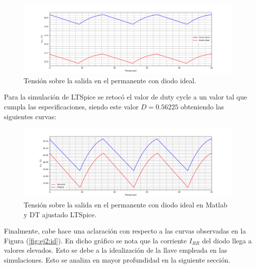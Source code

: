 \begin{figure}[H]
	\centering
	\includegraphics[width=0.9\linewidth]{ImagenesEjercicio-2/vo_diodo_ideal.png}
	\caption{Tensión sobre la salida en el permanente con diodo ideal.}
	\label{fig:ej2:vo_diodo_ideal}
\end{figure}
Para la simulación de LTSpice se retocó el valor de duty cycle a un valor tal que cumpla las especificaciones, siendo este valor $D=0.56225$ obteniendo las siguientes curvas:
\begin{figure}[H]
	\centering
	\includegraphics[width=0.9\linewidth]{ImagenesEjercicio-2/vo_duty_ideal.png}
	\caption{Tensión sobre la salida en el permanente con diodo ideal en Matlab y DT ajustado LTSpice.}
	\label{fig:ej2:vo_diodo_ideal_ltspice}
\end{figure}

Finalmente, cabe hace una aclaración con respecto a las curvas observadas en la Figura (\ref{fig:ej2:id}). En dicho gráfico se nota que la corriente $I_{RR}$ del diodo llega a valores elevados. Esto se debe a la idealización de la llave empleada en las simulaciones. Esto se analiza en mayor profundidad en la siguiente sección.

